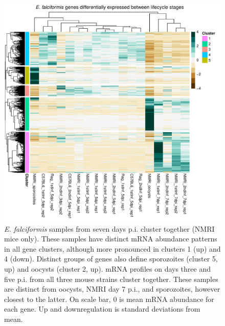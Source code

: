 \documentclass{bmcart}
\begin{document}
\begin{backmatter}
  \begin{figure}[h!]
  \includegraphics[width=0.7\linewidth]{ef-heatmap}
  \caption{
      \textit{E. falciformis} samples from seven days p.i. cluster together (NMRI mice only). These samples have distinct mRNA abundance patterns in all gene clusters, although more pronounced in clusters 1 (up) and 4 (down). Distinct groups of genes also define sporozoites (cluster 5, up) and oocysts (cluster 2, up). mRNA profiles on days three and five p.i. from all three mouse strains cluster together. These samples are distinct from oocysts, NMRI day 7 p.i., and sporozoites, however closest to the latter. On scale bar, 0 is mean mRNA abundance for each gene. Up and downregulation is standard deviations from mean.}
      \end{figure}


\end{backmatter}
\end{document}
